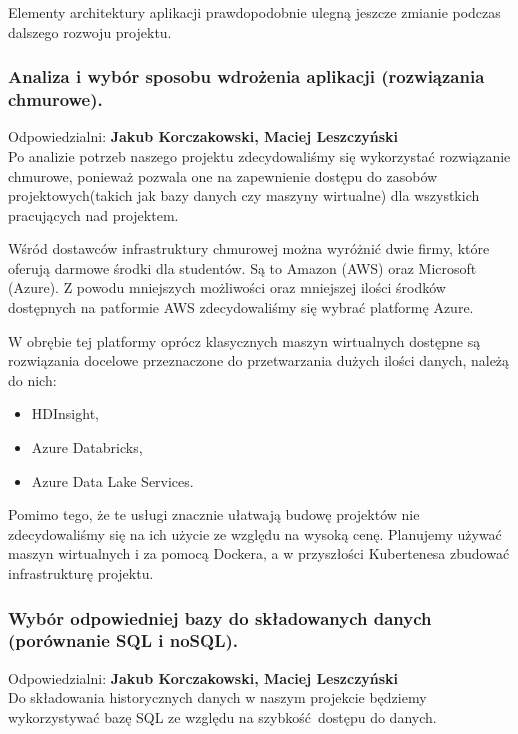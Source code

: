 \documentclass[a4paper,11pt, notitlepage ]{article}
\begin{document}
    Elementy architektury aplikacji prawdopodobnie ulegną jeszcze zmianie podczas dalszego rozwoju projektu.
    \subsubsection{Analiza i wybór sposobu wdrożenia aplikacji (rozwiązania chmurowe).} 
    Odpowiedzialni: \textbf{Jakub Korczakowski, Maciej Leszczyński}\\
    Po analizie potrzeb naszego projektu zdecydowaliśmy się wykorzystać rozwiązanie chmurowe, ponieważ pozwala one na zapewnienie dostępu do zasobów projektowych(takich jak bazy danych czy maszyny wirtualne) dla wszystkich pracujących nad projektem.
    
    Wśród dostawców infrastruktury chmurowej można wyróżnić dwie firmy, które oferują darmowe środki dla studentów. Są to Amazon (AWS) oraz Microsoft (Azure). Z powodu mniejszych możliwości oraz mniejszej ilości środków dostępnych na patformie AWS zdecydowaliśmy się wybrać platformę Azure.
    
    W obrębie tej platformy oprócz klasycznych maszyn wirtualnych dostępne są rozwiązania docelowe przeznaczone do przetwarzania dużych ilości danych, należą do nich:
    \begin{itemize}
        \item HDInsight,
        \item Azure Databricks,
        \item Azure Data Lake Services.
    \end{itemize}
    
    Pomimo tego, że te usługi znacznie ułatwają budowę projektów nie zdecydowaliśmy się na ich użycie ze względu na wysoką cenę. Planujemy używać maszyn wirtualnych i za pomocą Dockera, a w przyszłości Kubertenesa zbudować infrastrukturę projektu.
    \subsubsection{Wybór odpowiedniej bazy do składowanych danych (porównanie SQL i noSQL).} 
    Odpowiedzialni: \textbf{Jakub Korczakowski, Maciej Leszczyński}\\
    Do składowania historycznych danych w naszym projekcie będziemy wykorzystywać bazę SQL ze względu na szybkość dostępu do danych.
\end{document}
